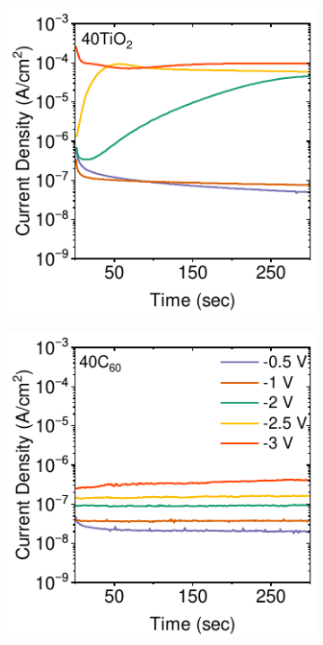 \begin{figure}[ht!]
    \begin{subfigure}[b]{0.32\textwidth}
        \centering
        \includegraphics[width=\textwidth]{chapters/transport_layers/images/StaticJV_40TiO2.pdf}
        \caption{}
    \end{subfigure}
    \hfill
    \begin{subfigure}[b]{0.32\textwidth}
        \centering
        \includegraphics[width=\textwidth]{chapters/transport_layers/images/StaticJV_40C60.pdf}

\end{subfigure}
\end{figure}
